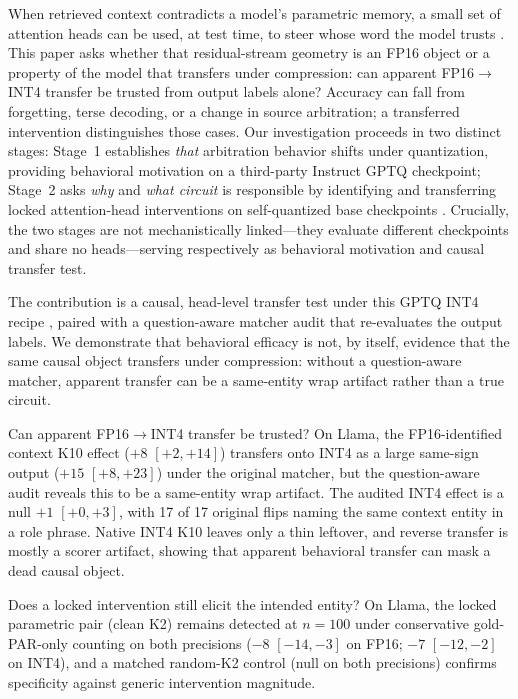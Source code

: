 \documentclass{article} %
\begin{document}
When retrieved context contradicts a model's parametric memory, a small set of attention heads can be used, at test time, to steer whose word the model trusts \citep{li2025taming}. This paper asks whether that residual-stream geometry is an FP16 object or a property of the model that transfers under compression: can apparent FP16$\to$INT4 transfer be trusted from output labels alone? Accuracy can fall from forgetting, terse decoding, or a change in source arbitration; a transferred intervention distinguishes those cases. Our investigation proceeds in two distinct stages: Stage~1 establishes \emph{that} arbitration behavior shifts under quantization, providing behavioral motivation on a third-party Instruct GPTQ checkpoint; Stage~2 asks \emph{why} and \emph{what circuit} is responsible by identifying and transferring locked attention-head interventions on self-quantized base checkpoints \citep{grattafiori2024llama,team2024gemma2}. Crucially, the two stages are not mechanistically linked---they evaluate different checkpoints and share no heads---serving respectively as behavioral motivation and causal transfer test.

The contribution is a causal, head-level transfer test under this GPTQ INT4 recipe \citep{frantar2023gptq}, paired with a question-aware matcher audit that re-evaluates the output labels. We demonstrate that behavioral efficacy is not, by itself, evidence that the same causal object transfers under compression: without a question-aware matcher, apparent transfer can be a same-entity wrap artifact rather than a true circuit.

Can apparent FP16$\to$INT4 transfer be trusted? On Llama, the FP16-identified context K10 effect ($+8$ $[+2, +14]$) transfers onto INT4 as a large same-sign output ($+15$ $[+8, +23]$) under the original matcher, but the question-aware audit reveals this to be a same-entity wrap artifact. The audited INT4 effect is a null $+1$ $[+0,+3]$, with 17 of 17 original flips naming the same context entity in a role phrase. Native INT4 K10 leaves only a thin leftover, and reverse transfer is mostly a scorer artifact, showing that apparent behavioral transfer can mask a dead causal object.

Does a locked intervention still elicit the intended entity? On Llama, the locked parametric pair (clean K2) remains detected at $n{=}100$ under conservative gold-PAR-only counting on both precisions ($-8$ $[-14,-3]$ on FP16; $-7$ $[-12,-2]$ on INT4), and a matched random-K2 control (null on both precisions) confirms specificity against generic intervention magnitude.
\end{document}
